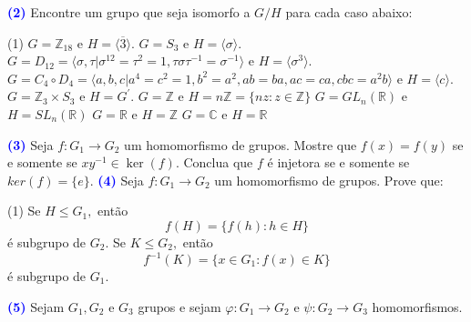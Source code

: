 \documentclass[12pt, a4paper]{article}
\newcommand{\negrito}[1]{\mbox{\boldmath{$#1$}}}
\begin{document}
\textcolor{blue}{\bf(2)}\label{58} Encontre um grupo que seja isomorfo a $G/H$ para cada caso abaixo:
\begin{tasks}[counter-format={(tsk[a])},label-width=3.6ex, label-format = {\bfseries}, column-sep = {0pt}](1)
\task[\textcolor{Floresta}{$\negrito{(a)} $}] $G = \mathbb{Z}_{18}$ e $H = \langle \overline{3} \rangle.$
\task[\textcolor{Floresta}{$\negrito{(b)} $}] $G = S_3$ e $H = \langle \sigma \rangle.$%
\task[\textcolor{Floresta}{$\negrito{(c)} $}] $G = D_{12} = \langle \sigma, \tau |\sigma^{12} = \tau^2 = 1, \tau \sigma \tau^{ -1} = \sigma^{-1} \rangle$ e $H = \langle \sigma^3 \rangle.$%
\task[\textcolor{Floresta}{$\negrito{(d)} $}] $G = C_4 \circ D_4 = \langle a,b,c | a^4 = c^2 = 1, b^2 = a^2, ab = ba, ac=ca, cbc = a^2b \rangle$ e $H = \langle c \rangle$.%
\task[\textcolor{Floresta}{$\negrito{(e)} $}] $G = \mathbb{Z}_3 \times S_3$ e $H = G^{\prime}.$
\task[\textcolor{Floresta}{$\negrito{(f)} $}] $G = \mathbb{Z}$ e $H = n \mathbb{Z} = \{nz : z \in \mathbb{Z} \}$
\task[\textcolor{Floresta}{$\negrito{(g)} $}] $G  = GL_n(\mathbb{R})$ e $H = SL_n(\mathbb{R})$%
\task[\textcolor{Floresta}{$\negrito{(h)} $}] $G  = \mathbb{R}$ e $H = \mathbb{Z}$%
\task[\textcolor{Floresta}{$\negrito{(i)} $}] $G  = \mathbb{C}$ e $H = \mathbb{R}$%
\end{tasks}
\textcolor{blue}{\bf(3)}\label{59} Seja $f \colon G_1 \to G_2$ um homomorfismo de grupos. Mostre que $f(x) = f(y)$ se e somente se $xy^{-1} \in \ker(f).$ Conclua que $f$ é injetora se e somente se $ker(f) = \{e \}.$
\newline\newline
\textcolor{blue}{\bf(4)}\label{60} Seja $f \colon G_1 \to G_2$ um homomorfismo de grupos. Prove que:
\begin{tasks}[counter-format={(tsk[a])},label-width=3.6ex, label-format = {\bfseries}, column-sep = {0pt}](1)
\task[\textcolor{Floresta}{$\negrito{(a)} $}] Se $H \le G_1,$ então
\[
f(H) = \{f(h) : h \in H \}
\]
é subgrupo de $G_2.$
\task[\textcolor{Floresta}{$\negrito{(b)} $}] Se $K \le G_2,$ então
\[
f^{-1}(K) = \{ x \in G_1 : f(x) \in K \}
\]
é subgrupo de $G_1.$
\end{tasks}
\textcolor{blue}{\bf(5)}\label{61} Sejam $G_1, G_2$ e $G_3$ grupos e sejam $\varphi \colon G_1 \to G_2$ e $\psi \colon G_2 \to G_3$ homomorfismos.
\end{document}
